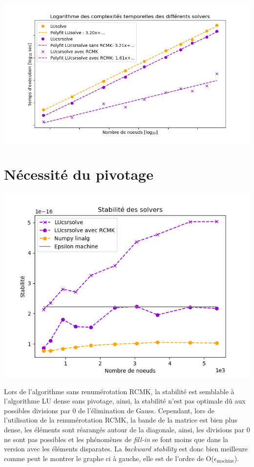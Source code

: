 \documentclass{article}[11pt]
\begin{document}
\begin{minipage}{0.5\textwidth}
    \includegraphics[width=\textwidth]{res/plots/complexitylog.png}
\end{minipage}
\section{Nécessité du pivotage}
\label{sec:pivotage}
\begin{minipage}{0.5\textwidth}
    \includegraphics[width=\textwidth]{res/plots/backward.png}
\end{minipage}
\begin{minipage}{0.5\textwidth}
    Lors de l'algorithme sans renumérotation RCMK, la stabilité est semblable à l'algorithme LU dense sans pivotage, ainsi, la stabilité n'est pas optimale dû aux possibles divisions par 0 de l'élimination de Gauss. Cependant, lors de l'utilisation de la renumérotation RCMK, la bande de la matrice est bien plus dense, les éléments sont réarangés autour de la diagonale, ainsi, les divisions par 0 ne sont pas possibles et les phénomènes de \textit{fill-in} se font moins que dans la version avec les éléments disparates. La \textit{backward stability} est donc bien meilleure comme peut le montrer le graphe ci à gauche, elle est de l'ordre de O($\epsilon_{\text{machine}}$).
\end{minipage}
\end{document}
